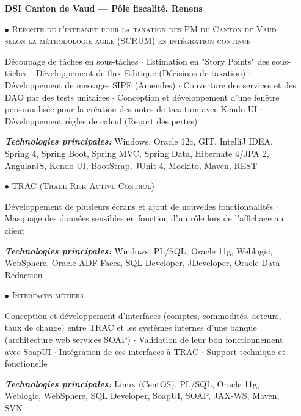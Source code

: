 \documentclass[10pt,a4paper]{moderncv}
\begin{document}
\vspace{1cm}

\begin{itemize}

	\item[] \textbf{DSI Canton de Vaud --- Pôle fiscalité, Renens}
	
	\item[$\bullet$] \textsc{Refonte de l’intranet pour la taxation des PM du Canton de Vaud selon la méthodologie agile (SCRUM) en intégration continue}
	\item[] Découpage de tâches en sous-tâches $\cdot$ Estimation en "Story Points" des sous-tâches $\cdot$ Développement de flux Editique (Décisions de taxation) $\cdot$ Développement de messages SIPF (Amendes) $\cdot$ Couverture des services et des DAO par des tests unitaires $\cdot$ Conception et développement d'une fenêtre personnalisée pour la création des notes de taxation avec Kendo UI $\cdot$ Développement règles de calcul (Report des pertes)
	\item[] \emph{\textbf{Technologies principales:}} Windows, Oracle 12c, GIT, IntelliJ IDEA, Spring 4, Spring Boot, Spring MVC, Spring Data, Hibernate 4/JPA 2, AngularJS, Kendo UI, BootStrap, JUnit 4, Mockito, Maven, REST	
\end{itemize}


\clearpage

\begin{itemize}
		
	\item[$\bullet$] \textsc{TRAC (Trade Risk Active Control)}
	\item[] Développement de plusieurs écrans et ajout de nouvelles fonctionnalités $\cdot$ Masquage des données sensibles en fonction d'un rôle lors de l'affichage au client
	\item[] \emph{\textbf{Technologies principales:}} Windows, PL/SQL, Oracle 11g, Weblogic, WebSphere, Oracle ADF Faces, SQL Developer, JDeveloper, Oracle Data Redaction

	\item[$\bullet$] \textsc{Interfaces métiers}
	\item[] Conception et développement d'interfaces (comptes, commodités, acteurs, taux de change) entre TRAC et les systèmes internes d'une banque (architecture web services SOAP) $\cdot$ Validation de leur bon fonctionnement avec SoapUI $\cdot$ Intégration de ces interfaces à TRAC $\cdot$  Support technique et fonctionelle
	\item[] \emph{\textbf{Technologies principales:}} Linux (CentOS), PL/SQL, Oracle 11g, Weblogic, WebSphere, SQL Developer, SoapUI, SOAP, JAX-WS, Maven, SVN	      	      	
\end{itemize}
\end{document}
